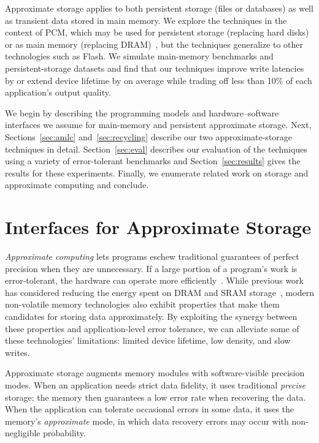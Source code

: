 \documentclass[prodmode,acmtocs]{acmsmall}
\begin{document}
Approximate storage applies to both persistent storage (files or databases) as well as transient
data stored in main memory.
We explore the techniques in the context of PCM, which may be used for
persistent storage (replacing hard disks) or as main memory
(replacing DRAM)~\cite{pcm-dram-alt,durable-pcm-mm,qureshi-pcm-mm},
but the techniques generalize to other technologies such as Flash.
We simulate main-memory benchmarks and
persistent-storage datasets and find that our techniques improve write
latencies by  or extend device lifetime by
 on
average while trading off less than 10\% of each application's output quality.

We begin by describing the programming models and hardware--software interfaces
we assume for main-memory and persistent approximate storage. Next,
Sections~\ref{sec:amlc} and~\ref{sec:recycling} describe our two
approximate-storage techniques in detail. Section~\ref{sec:eval} describes our
evaluation of the techniques using a variety of error-tolerant
benchmarks and Section~\ref{sec:results} gives the results for these
experiments. Finally, we enumerate related work on storage and approximate
computing and conclude.

\section{Interfaces for Approximate Storage}
\label{sec:idea}


\emph{Approximate computing} lets programs
eschew traditional guarantees of perfect precision when they are
unnecessary. If a large portion of a program's work is
error-tolerant, the hardware can operate more
efficiently~\cite{flikker,truffle,pcmos,stochasticproc,relax}.
While previous work has considered reducing the energy spent on DRAM
and SRAM storage~\cite{flikker,enerj,truffle}, modern non-volatile
memory technologies also exhibit properties that make them candidates
for storing data approximately. By exploiting the synergy between
these properties and application-level error tolerance, we can alleviate
some of these technologies' limitations: limited device
lifetime, low density, and slow writes.

Approximate storage augments memory modules with software-visible
precision modes. When an application needs strict data fidelity,
it uses traditional \emph{precise} storage; the memory then
guarantees a low error rate when recovering the data. When the
application can tolerate occasional errors in some data, it uses
the memory's \emph{approximate} mode, in which data recovery errors
may occur with non-negligible probability.
\end{document}
